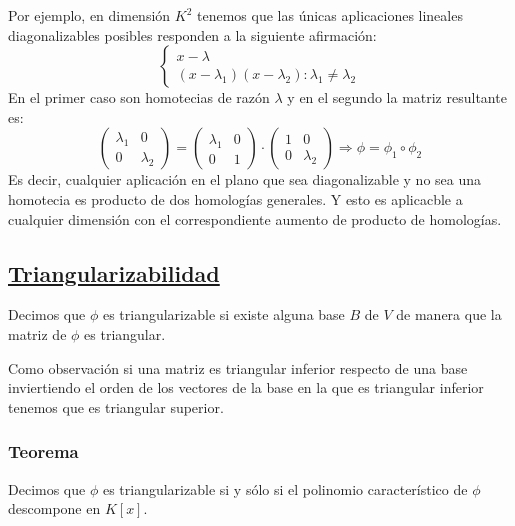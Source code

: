 \documentclass[10pt,a4paper,openright]{book}
\begin{document}
Por ejemplo, en dimensión $K^2$ tenemos que las únicas aplicaciones lineales diagonalizables posibles responden a la siguiente afirmación:
$$\begin{cases}x-\lambda \\ (x-\lambda_1)(x-\lambda_2): \lambda_1\neq \lambda_2 \end{cases}$$
En el primer caso son homotecias de razón $\lambda$ y en el segundo la matriz resultante es: 
$$\begin{pmatrix}
\lambda_1 & 0\\ 0&\lambda_2
\end{pmatrix}=\begin{pmatrix}
\lambda_1 & 0\\ 0&1
\end{pmatrix}\cdot\begin{pmatrix}
1 & 0\\ 0&\lambda_2
\end{pmatrix}\Rightarrow \phi=\phi_1\circ\phi_2$$
Es decir, cualquier aplicación en el plano que sea diagonalizable y no sea una homotecia es producto de dos homologías generales. Y esto es aplicacble a cualquier dimensión con el correspondiente aumento de producto de homologías.

\subsection*{\underline{Triangularizabilidad}}
Decimos que $\phi$ es triangularizable si existe alguna base $B$ de $V$ de manera que la matriz de $\phi$ es triangular.

Como observación si una matriz es triangular inferior respecto de una base inviertiendo el orden de los vectores de la base en la que es triangular inferior tenemos que es triangular superior.

\subsubsection*{Teorema}
Decimos que $\phi$ es triangularizable si y sólo si el polinomio característico de $\phi$ descompone en $K[x]$.
\end{document}
